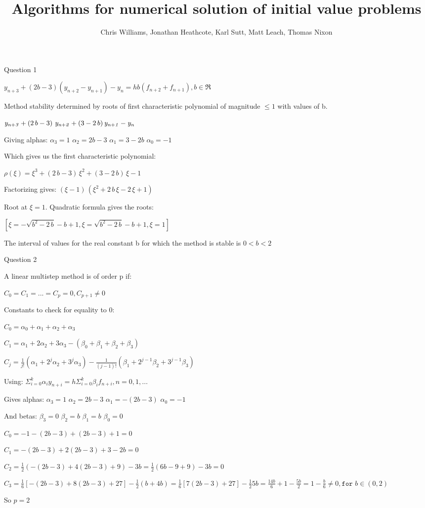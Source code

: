 \documentclass{beamer}
\title{Algorithms for numerical solution of initial value problems}
\author{Chris Williams, Jonathan Heathcote, Karl Sutt, Matt Leach, Thomas Nixon}
\begin{document}
\begin{frame}
	\titlepage
\end{frame}
\begin{frame}{Question 1}

$y_{n+3} + (2b - 3)(y_{n+2} - y_{n+1}) - y_n = hb(f_{n+2} + f_{n+1}), b \in \Re$

Method stability determined by roots of first characteristic polynomial of magnitude $\le 1$ with values of b.

${\it y_{n+3}}+\left(2\,b-3\right)\,{\it y_{n+2}}+\left(3-2\,b\right) {\it y_{n+1}}-{\it y_n}$

Giving alphas: $\alpha_3 = 1$ $\alpha_2 = 2b - 3$ $\alpha_1 = 3 - 2b$ $\alpha_0 = -1$

Which gives us the first characteristic polynomial:

$\rho(\xi) = \xi^3+\left(2\,b-3\right)\,\xi^2+\left(3-2\,b\right)\,\xi-1$

Factorizing gives: $\left(\xi-1\right)\,\left(\xi^2+2\,b\,\xi-2\,\xi+1\right)$

Root at $\xi = 1$. Quadratic formula gives the roots:

$\left[ \xi=-\sqrt{b^2-2\,b}-b+1 , \xi=\sqrt{b^2-2\,b}-b+1 , \xi=1 \right]$

The interval of values for the real constant b for which the method is stable is $0 < b < 2$
\end{frame}

\begin{frame}{Question 2}

A linear multistep method is of order p if:

$C_0 = C_1 = ... = C_p = 0, C_{p+1} \ne 0$

Constants to check for equality to 0:

$C_0 = \alpha_0 + \alpha_1 + \alpha_2 + \alpha_3$

$C_1 = \alpha_1 + 2\alpha_2 + 3\alpha_3 - (\beta_0 + \beta_1 + \beta_2 + \beta_3)$

$C_j = \frac{1}{j!} (\alpha_1 + 2^j\alpha_2 + 3^j\alpha_3) - \frac{1}{(j-1)!} (\beta_1 + 2^{j-1}\beta_2 + 3^{j-1}\beta_3)$

Using: $\Sigma_{i=0}^{k}\alpha_iy_{n+i} = h \Sigma_{i=0}^{k} \beta_i f_{n+i}, n=0,1,\ldots$

Gives alphas: $\alpha_3 = 1$ $\alpha_2 = 2b - 3$ $\alpha_1 = -(2b - 3)$ $\alpha_0 = -1$

And betas: $\beta_3 = 0$ $\beta_2 = b$ $\beta_1 = b$ $\beta_0 = 0$

$C_0 = -1 - (2b - 3) + (2b - 3) + 1 = 0$

$C_1 = -(2b - 3) + 2(2b-3) + 3 - 2b = 0$

$C_2 = \frac{1}{2}(-(2b-3) + 4(2b-3) + 9) - 3b = \frac{1}{2} (6b - 9 + 9) - 3b = 0$

$C_3 = \frac{1}{6}[-(2b-3) + 8(2b-3) + 27] - \frac{1}{2}(b+4b) = \frac{1}{6}[7(2b-3) + 27] - \frac{1}{2}5b = \frac{14b}{6} + 1 - \frac{5b}{2} = 1 - \frac{b}{6} \ne 0, \texttt{for } b \in (0,2)$

So $p = 2$

\end{frame}
\end{document}
